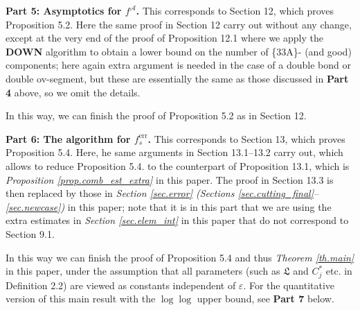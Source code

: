\documentclass[10pt, reqno]{amsart}
\newcommand{\Ac}{\mathcal A}
\newcommand{\Lf}{\mathfrak L}
\theoremstyle{definition}
\theoremstyle{remark}
\numberwithin{equation}{section}
\begin{document}
\medskip
\textbf{Part 5: Asymptotics for $f^\Ac$.} This corresponds to Section 12, which proves Proposition 5.2. Here the same proof in Section 12 carry out without any change, except at the very end of the proof of Proposition 12.1 where we apply the \textbf{DOWN} algorithm to obtain a lower bound on the number of \{33A\}- (and good) components; here again extra argument is needed in the case of a double bond or double ov-segment, but these are essentially the same as those discussed in \textbf{Part 4} above, so we omit the details.

In this way, we can finish the proof of Proposition 5.2 as in Section 12.

\medskip
\textbf{Part 6: The algorithm for $f_s^{\mathrm{err}}$.} This corresponds to Section 13, which proves Proposition 5.4. Here, he same arguments in Section 13.1--13.2 carry out, which allows to reduce Proposition 5.4. to the counterpart of Proposition 13.1, which is \emph{Proposition \ref{prop.comb_est_extra}} in this paper. The proof in Section 13.3 is then replaced by those in \emph{Section \ref{sec.error} (Sections \ref{sec.cutting_final}--\ref{sec.newcase})} in this paper; note that it is in this part that we are using the extra estimates in \emph{Section \ref{sec.elem_int}} in this paper that do not correspond to Section 9.1.

In this way we can finish the proof of Proposition 5.4 and thus \emph{Theorem \ref{th.main}} in this paper, under the assumption that all parameters (such as $\Lf$ and $C_j^*$ etc. in Definition 2.2) are viewed as constants independent of $\varepsilon$. For the quantitative version of this main result with the $\log\log$ upper bound, see \textbf{Part 7} below.
\end{document}
